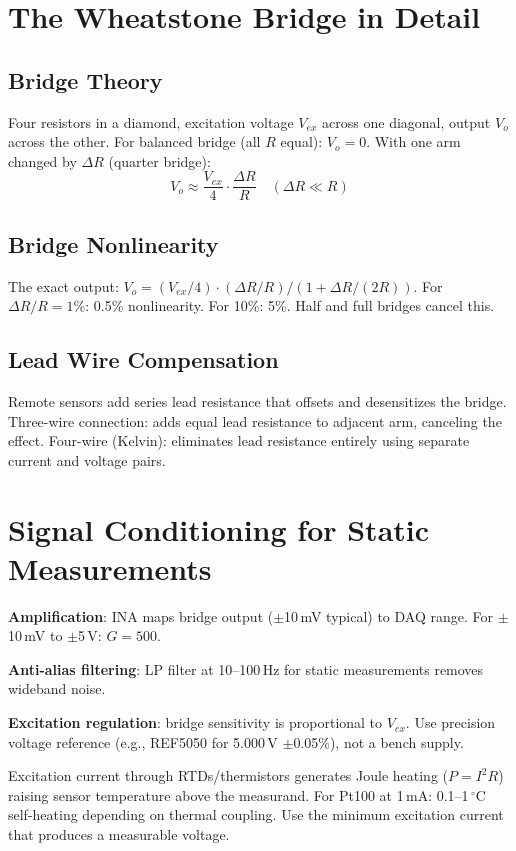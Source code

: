 \documentclass[11pt,letterpaper,twoside,openany]{book}
\newcommand{\degC}{\ensuremath{{}^{\circ}\text{C}}}
\begin{document}
\section{The Wheatstone Bridge in Detail}
\subsection{Bridge Theory}
Four resistors in a diamond, excitation voltage $V_{ex}$ across one diagonal, output $V_o$ across the other. For balanced bridge (all $R$ equal): $V_o = 0$. With one arm changed by $\Delta R$ (quarter bridge):
\begin{equation}
V_o \approx \frac{V_{ex}}{4} \cdot \frac{\Delta R}{R} \quad (\Delta R \ll R)
\end{equation}

\subsection{Bridge Nonlinearity}
The exact output: $V_o = (V_{ex}/4) \cdot (\Delta R/R)/(1 + \Delta R/(2R))$. For $\Delta R/R = 1\%$: 0.5\% nonlinearity. For 10\%: 5\%. Half and full bridges cancel this.

\subsection{Lead Wire Compensation}
Remote sensors add series lead resistance that offsets and desensitizes the bridge. Three-wire connection: adds equal lead resistance to adjacent arm, canceling the effect. Four-wire (Kelvin): eliminates lead resistance entirely using separate current and voltage pairs.

\section{Signal Conditioning for Static Measurements}
\textbf{Amplification}: INA maps bridge output ($\pm$10\,mV typical) to DAQ range. For $\pm$10\,mV to $\pm$5\,V: $G = 500$.

\textbf{Anti-alias filtering}: LP filter at 10--100\,Hz for static measurements removes wideband noise.

\textbf{Excitation regulation}: bridge sensitivity is proportional to $V_{ex}$. Use precision voltage reference (e.g., REF5050 for 5.000\,V $\pm$0.05\%), not a bench supply.

\begin{tipbox}
Excitation current through RTDs/thermistors generates Joule heating ($P = I^2 R$) raising sensor temperature above the measurand. For Pt100 at 1\,mA: 0.1--1\,\degC{} self-heating depending on thermal coupling. Use the minimum excitation current that produces a measurable voltage.
\end{tipbox}
\end{document}
